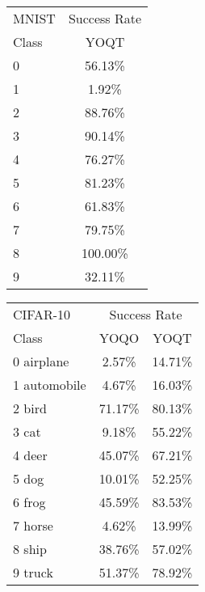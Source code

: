 \documentclass[letterpaper]{article}
\begin{document}
	\begin{table*}[t]
		\centering
		\begin{tabular}{lc}
			\toprule
			MNIST & Success Rate \\
			Class & YOQT \\
			\midrule
			0       &  56.13\% \\
			1       &   1.92\% \\ 
			2       &  88.76\% \\ 
			3       &  90.14\% \\ 
			4       &  76.27\% \\ 
			5       &  81.23\% \\ 
			6       &  61.83\% \\ 
			7       &  79.75\% \\ 
			8       & 100.00\% \\ 
			9       &  32.11\% \\
			\bottomrule
		\end{tabular}
		\hspace{1.0 in}
		\begin{tabular}{lcc}
			\toprule
			CIFAR-10 & \multicolumn{2}{c}{Success Rate} \\
			Class & YOQO & YOQT \\
			\midrule
			0 airplane   &  2.57\% & 14.71\% \\
			1 automobile &  4.67\% & 16.03\% \\ 
			2 bird       & 71.17\% & 80.13\% \\ 
			3 cat        &  9.18\% & 55.22\% \\ 
			4 deer       & 45.07\% & 67.21\% \\ 
			5 dog        & 10.01\% & 52.25\% \\ 
			6 frog       & 45.59\% & 83.53\% \\ 
			7 horse      &  4.62\% & 13.99\% \\ 
			8 ship       & 38.76\% & 57.02\% \\ 
			9 truck      & 51.37\% & 78.92\% \\
			\bottomrule
		\end{tabular}
		
		\caption{Success rate by class for universal targeted attacks on MNIST (left table) and CIFAR-10 (right table) classifiers}
		\label{tab:mnist_appendix}
	\end{table*}
	
	
	
\end{document}
